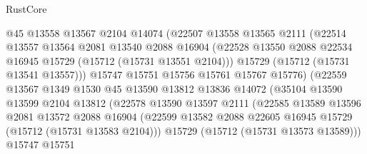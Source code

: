 \begin{lexlean}{RustCore}
\begin{coremodule}
                          @45
                          @13558
                          @13567
                          @2104
                          @14074
                          (@22507
                            @13558
                            @13565
                            @2111
                            (@22514
                              @13557
                              @13564
                              @2081
                              @13540
                              @2088
                              @16904
                              (@22528
                                @13550
                                @2088
                                @22534
                                @16945
                                @15729
                                (@15712 (@15731 @13551 @2104)))
                              @15729
                              (@15712 (@15731 @13541 @13557)))
                            @15747
                            @15751
                            @15756
                            @15761
                            @15767
                            @15776)
                          (@22559
                            @13567
                            @1349
                            @1530
                            @45
                            @13590
                            @13812
                            @13836
                            @14072
                            (@35104
                              @13590
                              @13599
                              @2104
                              @13812
                              (@22578
                                @13590
                                @13597
                                @2111
                                (@22585
                                  @13589
                                  @13596
                                  @2081
                                  @13572
                                  @2088
                                  @16904
                                  (@22599
                                    @13582
                                    @2088
                                    @22605
                                    @16945
                                    @15729
                                    (@15712 (@15731 @13583 @2104)))
                                  @15729
                                  (@15712 (@15731 @13573 @13589)))
                                @15747
                                @15751

\end{coremodule}
\end{lexlean}
